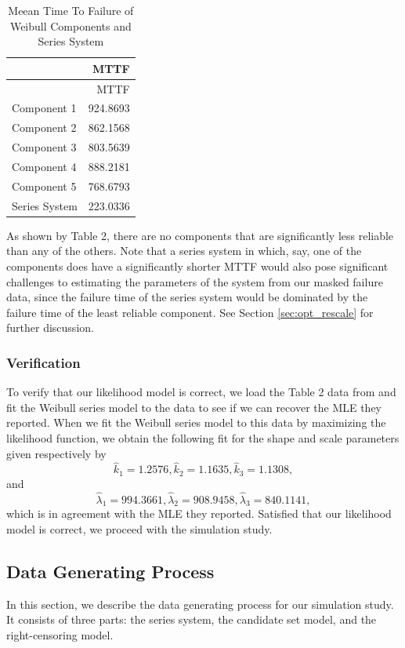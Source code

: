 \documentclass[
]{article}
\begin{document}
\begin{longtable}[]{@{}lr@{}}
\caption{Meean Time To Failure of Weibull Components and Series
System}\tabularnewline
\toprule
& MTTF\tabularnewline
\midrule
\endfirsthead
\toprule
& MTTF\tabularnewline
\midrule
\endhead
Component 1 & 924.8693\tabularnewline
Component 2 & 862.1568\tabularnewline
Component 3 & 803.5639\tabularnewline
Component 4 & 888.2181\tabularnewline
Component 5 & 768.6793\tabularnewline
Series System & 223.0336\tabularnewline
\bottomrule
\end{longtable}

As shown by Table 2, there are no components that are significantly less
reliable than any of the others. Note that a series system in which,
say, one of the components does have a significantly shorter MTTF would
also pose significant challenges to estimating the parameters of the
system from our masked failure data, since the failure time of the
series system would be dominated by the failure time of the least
reliable component. See Section \ref{sec:opt_rescale} for further
discussion.

\hypertarget{verification}{%
\subsubsection*{Verification}\label{verification}}

To verify that our likelihood model is correct, we load the Table 2 data
from \citep{Huairu-2013} and fit the Weibull series model to the data to
see if we can recover the MLE they reported. When we fit the Weibull
series model to this data by maximizing the likelihood function, we
obtain the following fit for the shape and scale parameters given
respectively by \[
    \hat{k}_1 = 1.2576,
    \hat{k}_2 = 1.1635,
    \hat{k}_3 = 1.1308,
\] and \[
    \hat{\lambda}_1 = 994.3661,
    \hat{\lambda}_2 = 908.9458,
    \hat{\lambda}_3 = 840.1141,
\] which is in agreement with the MLE they reported. Satisfied that our
likelihood model is correct, we proceed with the simulation study.

\hypertarget{data-generating-process}{%
\subsection{Data Generating Process}\label{data-generating-process}}

In this section, we describe the data generating process for our
simulation study. It consists of three parts: the series system, the
candidate set model, and the right-censoring model.
\end{document}
